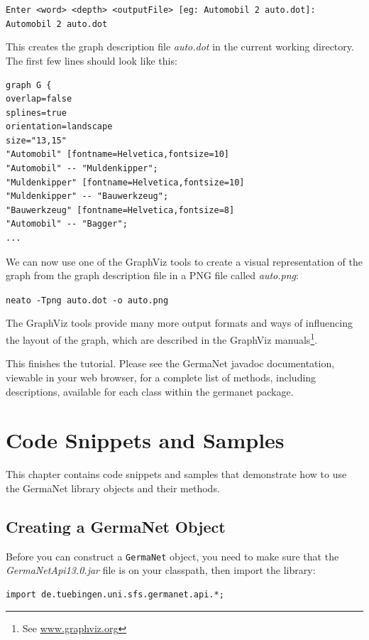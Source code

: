 \documentclass[12pt,a4paper,english,utf8]{report}
\begin{document}
\texttt{Enter <word> <depth> <outputFile> [eg: Automobil 2 auto.dot]:
Automobil 2 auto.dot}

This creates the graph description file \emph{auto.dot} in the current working directory. The first few lines should look like this:

\begin{lstlisting}
graph G {
overlap=false
splines=true
orientation=landscape
size="13,15"
"Automobil" [fontname=Helvetica,fontsize=10]
"Automobil" -- "Muldenkipper";
"Muldenkipper" [fontname=Helvetica,fontsize=10]
"Muldenkipper" -- "Bauwerkzeug";
"Bauwerkzeug" [fontname=Helvetica,fontsize=8]
"Automobil" -- "Bagger";
...
\end{lstlisting}

We can now use one of the GraphViz tools to create a visual representation of the graph from the graph description file in a PNG file called \emph{auto.png}:

\texttt{neato -Tpng auto.dot -o auto.png}

The GraphViz tools provide many more output formats and ways of influencing the layout of the graph, which are described in the GraphViz manuals\footnote{See \href{www.graphviz.org}{www.graphviz.org}}.

This finishes the tutorial. Please see the GermaNet javadoc documentation, viewable in your web browser, for a complete list of methods, including descriptions, available for each class within the germanet package.





\chapter{Code Snippets and Samples}
This chapter contains code snippets and samples that demonstrate how to use the GermaNet library objects and their methods.



\section{Creating a GermaNet Object}
\label{snippetsStart}
Before you can construct a \texttt{GermaNet} object, you need to make sure that the \emph{GermaNetApi13.0.jar} file is on your classpath, then import the library:

\begin{lstlisting}
import de.tuebingen.uni.sfs.germanet.api.*;
\end{lstlisting}
\end{document}
